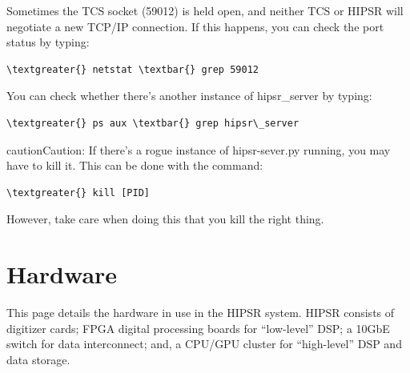 \documentclass[letterpaper,10pt,english]{sphinxmanual}
\begin{document}
Sometimes the TCS socket (59012) is held open, and neither TCS or HIPSR will negotiate
a new TCP/IP connection. If this happens, you can check the port status by typing:

\begin{Verbatim}[commandchars=\\\{\}]
\textgreater{} netstat \textbar{} grep 59012
\end{Verbatim}

You can check whether there's another instance of hipsr\_server by typing:

\begin{Verbatim}[commandchars=\\\{\}]
\textgreater{} ps aux \textbar{} grep hipsr\_server
\end{Verbatim}

\begin{notice}{caution}{Caution:}
If there's a rogue instance of hipsr-sever.py running, you may have to kill it.
This can be done with the command:

\begin{Verbatim}[commandchars=\\\{\}]
\textgreater{} kill [PID]
\end{Verbatim}

However, take care when doing this that you kill the right thing.
\end{notice}


\chapter{Hardware}
\label{hardware:hardware-chapter}\label{hardware:hardware}\label{hardware:telescope-user-guide}\label{hardware::doc}
This page details the hardware in use in the HIPSR system. HIPSR consists of digitizer
cards; FPGA digital processing boards for ``low-level'' DSP; a 10GbE switch for data
interconnect; and, a CPU/GPU cluster for ``high-level'' DSP and data storage.
\end{document}
